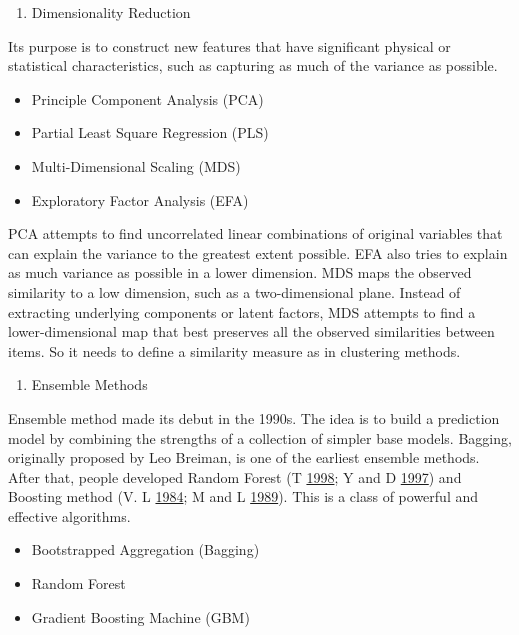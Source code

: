 \documentclass[]{book}
\providecommand{\tightlist}{%
  \setlength{\itemsep}{0pt}\setlength{\parskip}{0pt}}
\theoremstyle{definition}
\theoremstyle{definition}
\theoremstyle{remark}
\begin{document}
\begin{enumerate}
\def\labelenumi{\arabic{enumi}.}
\setcounter{enumi}{11}
\tightlist
\item
  Dimensionality Reduction
\end{enumerate}

Its purpose is to construct new features that have significant physical
or statistical characteristics, such as capturing as much of the
variance as possible.

\begin{itemize}
\tightlist
\item
  Principle Component Analysis (PCA)
\item
  Partial Least Square Regression (PLS)
\item
  Multi-Dimensional Scaling (MDS)
\item
  Exploratory Factor Analysis (EFA)
\end{itemize}

PCA attempts to find uncorrelated linear combinations of original
variables that can explain the variance to the greatest extent possible.
EFA also tries to explain as much variance as possible in a lower
dimension. MDS maps the observed similarity to a low dimension, such as
a two-dimensional plane. Instead of extracting underlying components or
latent factors, MDS attempts to find a lower-dimensional map that best
preserves all the observed similarities between items. So it needs to
define a similarity measure as in clustering methods.

\begin{enumerate}
\def\labelenumi{\arabic{enumi}.}
\setcounter{enumi}{12}
\tightlist
\item
  Ensemble Methods
\end{enumerate}

Ensemble method made its debut in the 1990s. The idea is to build a
prediction model by combining the strengths of a collection of simpler
base models. Bagging, originally proposed by Leo Breiman, is one of the
earliest ensemble methods. After that, people developed Random Forest (T
\protect\hyperlink{ref-Ho1998}{1998}; Y and D
\protect\hyperlink{ref-amit1997}{1997}) and Boosting method (V. L
\protect\hyperlink{ref-Valiant1984}{1984}; M and L
\protect\hyperlink{ref-KV1989}{1989}). This is a class of powerful and
effective algorithms.

\begin{itemize}
\tightlist
\item
  Bootstrapped Aggregation (Bagging)
\item
  Random Forest
\item
  Gradient Boosting Machine (GBM)
\end{itemize}
\end{document}
